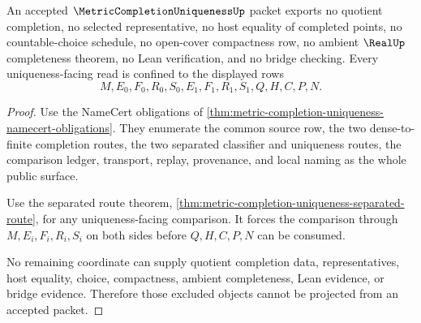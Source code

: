 \begin{theorem}
\label{thm:metric-completion-uniqueness-nonescape}
An accepted $\MetricCompletionUniquenessUp$ packet exports no quotient completion, no selected representative, no host equality of completed points, no countable-choice schedule, no open-cover compactness row, no ambient $\RealUp$ completeness theorem, no Lean verification, and no bridge checking. Every uniqueness-facing read is confined to the displayed rows
$$
M,E_0,F_0,R_0,S_0,E_1,F_1,R_1,S_1,Q,H,C,P,N .
$$
\end{theorem}
\begin{proof}
Use the NameCert obligations of \autoref{thm:metric-completion-uniqueness-namecert-obligations}. They enumerate the common source row, the two dense-to-finite completion routes, the two separated classifier and uniqueness routes, the comparison ledger, transport, replay, provenance, and local naming as the whole public surface.

Use the separated route theorem, \autoref{thm:metric-completion-uniqueness-separated-route}, for any uniqueness-facing comparison. It forces the comparison through $M,E_i,F_i,R_i,S_i$ on both sides before $Q,H,C,P,N$ can be consumed.

No remaining coordinate can supply quotient completion data, representatives, host equality, choice, compactness, ambient completeness, Lean evidence, or bridge evidence. Therefore those excluded objects cannot be projected from an accepted packet.
\end{proof}

\begin{closurestatus}{\MetricCompletionUniquenessUp}
  \theoryclosure{\seedClosure}
  \formalstatus{\unformalizedV}
\end{closurestatus}
